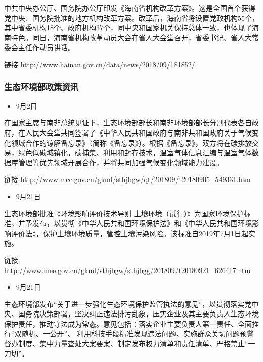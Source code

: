 \documentclass[]{book}
\providecommand{\tightlist}{%
  \setlength{\itemsep}{0pt}\setlength{\parskip}{0pt}}
\begin{document}
中共中央办公厅、国务院办公厅印发《海南省机构改革方案》。这是全国首个获得党中央、国务院批准的地方机构改革方案。改革后，海南省将设置党政机构55个，其中省委机构18个、政府机构37个，同中央和国家机关保持总体一致，也体现了海南特色。同日，海南省机构改革动员大会在省人大会堂召开，省委书记、省人大常委会主任作动员讲话。

链接 \url{http://www.hainan.gov.cn/data/news/2018/09/181852/}

\hypertarget{ux751fux6001ux73afux5883ux90e8ux653fux7b56ux8d44ux8baf-5}{%
\subsubsection*{生态环境部政策资讯}\label{ux751fux6001ux73afux5883ux90e8ux653fux7b56ux8d44ux8baf-5}}

\begin{itemize}
\tightlist
\item
  9月2日
\end{itemize}

在国家主席与南非总统见证下，生态环境部部长和南非环境部部长分别代表各自政府，在人民大会堂共同签署了《中华人民共和国政府与南非共和国政府关于气候变化领域合作的谅解备忘录》（简称《备忘录》）。根据《备忘录》，双方将在碳排放交易，绿色低碳城镇化，碳捕集、利用和封存技术，温室气体信息汇编与温室气体数据库管理等优先领域开展合作，并将共同加强气候变化领域能力建设。

链接 \url{http://www.mee.gov.cn/gkml/sthjbgw/qt/201809/t20180905_549331.htm}

\begin{itemize}
\tightlist
\item
  9月21日
\end{itemize}

生态环境部批准《环境影响评价技术导则 土壤环境（试行）》为国家环境保护标准，并予发布，以贯彻《中华人民共和国环境保护法》和《中华人民共和国环境影响评价法》，保护土壤环境质量，管控土壤污染风险。该标准自2019年7月1日起实施。

链接 \url{http://www.mee.gov.cn/gkml/sthjbgw/sthjbgg/201809/t20180921_626417.htm}

\begin{itemize}
\tightlist
\item
  9月21日
\end{itemize}

生态环境部发布``关于进一步强化生态环境保护监管执法的意见''，以贯彻落实党中央、国务院决策部署，坚决纠正违法排污乱象，压实企业及其主要负责人生态环境保护责任，推动守法成为常态。意见包括：落实企业主要负责人第一责任、全面推行``双随机、一公开''、 利用科技手段精准发现违法问题、实施群众关切问题预警督办制度、集中力量查处大案要案、制定发布权力清单和责任清单、严格禁止``一刀切''。
\end{document}
